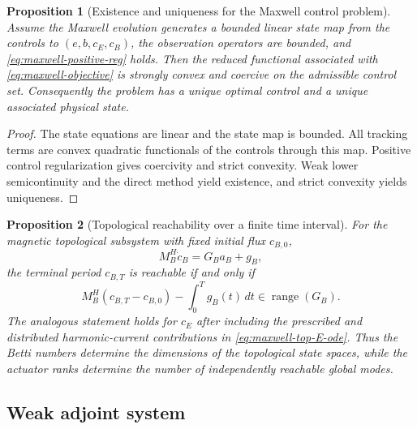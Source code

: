 \documentclass{article}
\newtheorem{proposition}{Proposition}[section]
\DeclareMathOperator{\range}{range}
\begin{document}
\begin{proposition}[Existence and uniqueness for the Maxwell control problem]
\label{prop:maxwell-existence}
Assume the Maxwell evolution generates a bounded linear state map from the controls to $(e,b,c_E,c_B)$, the observation operators are bounded, and \eqref{eq:maxwell-positive-reg} holds.  Then the reduced functional associated with \eqref{eq:maxwell-objective} is strongly convex and coercive on the admissible control set.  Consequently the problem has a unique optimal control and a unique associated physical state.
\end{proposition}

\begin{proof}
The state equations are linear and the state map is bounded.  All tracking terms are convex quadratic functionals of the controls through this map.  Positive control regularization gives coercivity and strict convexity.  Weak lower semicontinuity and the direct method yield existence, and strict convexity yields uniqueness.
\end{proof}

\begin{proposition}[Topological reachability over a finite time interval]
\label{prop:maxwell-reachability}
For the magnetic topological subsystem with fixed initial flux $c_{B,0}$,
\[
  M_B^H\dot c_B=G_Ba_B+g_B,
\]
the terminal period $c_{B,T}$ is reachable if and only if
\begin{equation}
  M_B^H(c_{B,T}-c_{B,0})-\int_0^T g_B(t)\,dt
  \in\range(G_B).
\end{equation}
The analogous statement holds for $c_E$ after including the prescribed and distributed harmonic-current contributions in \eqref{eq:maxwell-top-E-ode}.  Thus the Betti numbers determine the dimensions of the topological state spaces, while the actuator ranks determine the number of independently reachable global modes.
\end{proposition}

\subsection{Weak adjoint system}
\label{sec:maxwell-adjoint}
\end{document}
